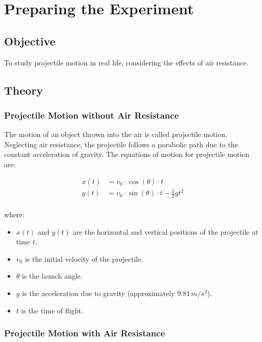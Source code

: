 \chapter{Preparing the Experiment}

\section{Objective}

To study projectile motion in real life, considering the effects of air resistance. 

\section{Theory}

\subsection{Projectile Motion without Air Resistance}

The motion of an object thrown into the air is called projectile motion. Neglecting air resistance, the projectile follows a parabolic path due to the constant acceleration of gravity. The equations of motion for projectile motion are:

\begin{equation}
    \begin{split}
        x(t) &= v_{0} \cdot \cos(\theta) \cdot t \\
        y(t) &= v_{0} \cdot \sin(\theta) \cdot t - \frac{1}{2} g t^2 \\
    \end{split}
\end{equation}

\noindent where:

\begin{itemize}
    \item $x(t)$ and $y(t)$ are the horizontal and vertical positions of the projectile at time $t$.
    \item $v_{0}$ is the initial velocity of the projectile.
    \item $\theta$ is the launch angle.
    \item $g$ is the acceleration due to gravity (approximately $9.81 \, m/s^2$).
    \item $t$ is the time of flight.
\end{itemize}

\subsection{Projectile Motion with Air Resistance}

